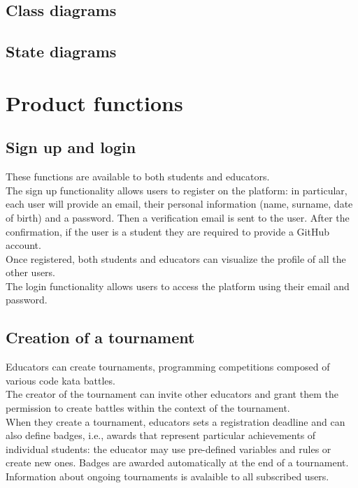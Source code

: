 \subsection{Class diagrams}

\subsection{State diagrams}

\section{Product functions}
\subsection{Sign up and login}
These functions are available to both students and educators.\\
The sign up functionality allows users to register on the platform: in particular, each user will provide an email,
their personal information (name, surname, date of birth) and a password. Then a verification email is sent to the user.
After the confirmation, if the user is a student they are required to provide a GitHub account.\\
Once registered, both students and educators can visualize the profile of all the other users.\\
The login functionality allows users to access the platform using their email and password.\\

\subsection{Creation of a tournament}
Educators can create tournaments, programming competitions composed of various code kata battles.\\
The creator of the tournament can invite other educators and grant them the permission to create battles within the 
context of the tournament.\\
When they create a tournament, educators sets a registration deadline and can also define badges, i.e., awards that 
represent particular achievements of individual students: the educator may use pre-defined variables and rules or create 
new ones. Badges are awarded automatically at the end of a tournament.\\
Information about ongoing tournaments is avalaible to all subscribed users.\\

